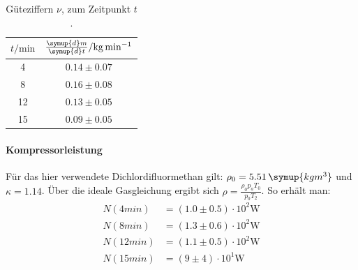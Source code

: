 \begin{table}
  \centering
  \caption{Güteziffern $\nu$, zum Zeitpunkt $t$.}
  \label{tab:dm}
  \begin{tabular}{S S}
    \toprule
    {$t/\si{\minute}$} & {$\frac{\symup{d}m}{\symup{d}t}/\si{\kilo \gram \per \minute}$}\\
       & {$0.14 \pm 0.07$} \\
    8   & {$0.16 \pm 0.08$} \\
    12  & {$0.13 \pm 0.05$} \\
    15  & {$0.09  \pm 0.05$} \\
    \bottomrule
  \end{tabular}
\end{table}

\paragraph{Kompressorleistung}
Für das hier verwendete Dichlordifluormethan gilt: $\rho_0 =5.51 \, \symup{kg m^3}$ und $\kappa = 1.14$. Über die ideale Gasgleichung ergibt sich $\rho = \frac{\rho_0 p_a T_0}{p_0 T_2}$.
So erhält man:
\begin{align*}
N(4min) &= (1.0 \pm 0.5) \cdot 10^2 \si{\watt} \\
N(8min) &=  (1.3 \pm 0.6)\cdot 10^2 \si{\watt} \\
N(12min) &=  (1.1 \pm 0.5)\cdot 10^2 \si{\watt} \\
N(15min) &=  (9 \pm 4)\cdot 10^1 \si{\watt}
\end{align*}
